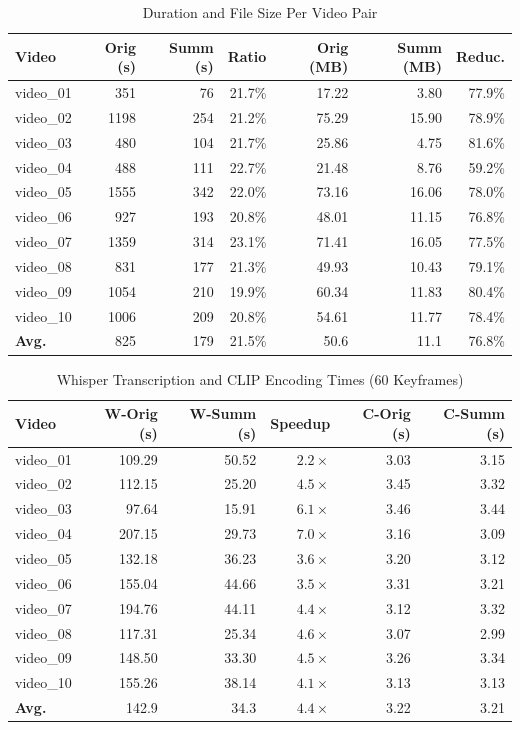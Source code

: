 \documentclass[10pt,conference]{IEEEtran}
\begin{document}
\begin{table}[H]
\centering
\caption{Duration and File Size Per Video Pair}
\label{tab:vi_size}
\begin{tabular}{lrrrrrr}
\toprule
\textbf{Video} & \textbf{Orig (s)} & \textbf{Summ (s)} & \textbf{Ratio} &
\textbf{Orig (MB)} & \textbf{Summ (MB)} & \textbf{Reduc.} \\
\midrule
video\_01 & 351  & 76  & 21.7\% & 17.22 & 3.80  & 77.9\% \\
video\_02 & 1198 & 254 & 21.2\% & 75.29 & 15.90 & 78.9\% \\
video\_03 & 480  & 104 & 21.7\% & 25.86 & 4.75  & 81.6\% \\
video\_04 & 488  & 111 & 22.7\% & 21.48 & 8.76  & 59.2\% \\
video\_05 & 1555 & 342 & 22.0\% & 73.16 & 16.06 & 78.0\% \\
video\_06 & 927  & 193 & 20.8\% & 48.01 & 11.15 & 76.8\% \\
video\_07 & 1359 & 314 & 23.1\% & 71.41 & 16.05 & 77.5\% \\
video\_08 & 831  & 177 & 21.3\% & 49.93 & 10.43 & 79.1\% \\
video\_09 & 1054 & 210 & 19.9\% & 60.34 & 11.83 & 80.4\% \\
video\_10 & 1006 & 209 & 20.8\% & 54.61 & 11.77 & 78.4\% \\
\midrule
\textbf{Avg.} & 825 & 179 & 21.5\% & 50.6 & 11.1 & 76.8\% \\
\bottomrule
\end{tabular}
\end{table}

\begin{table}[H]
\centering
\caption{Whisper Transcription and CLIP Encoding Times (60 Keyframes)}
\label{tab:vi_time}
\begin{tabular}{lrrrrr}
\toprule
\textbf{Video} & \textbf{W-Orig (s)} & \textbf{W-Summ (s)} &
\textbf{Speedup} & \textbf{C-Orig (s)} & \textbf{C-Summ (s)} \\
\midrule
video\_01 & 109.29 & 50.52 & $2.2\times$ & 3.03 & 3.15 \\
video\_02 & 112.15 & 25.20 & $4.5\times$ & 3.45 & 3.32 \\
video\_03 &  97.64 & 15.91 & $6.1\times$ & 3.46 & 3.44 \\
video\_04 & 207.15 & 29.73 & $7.0\times$ & 3.16 & 3.09 \\
video\_05 & 132.18 & 36.23 & $3.6\times$ & 3.20 & 3.12 \\
video\_06 & 155.04 & 44.66 & $3.5\times$ & 3.31 & 3.21 \\
video\_07 & 194.76 & 44.11 & $4.4\times$ & 3.12 & 3.32 \\
video\_08 & 117.31 & 25.34 & $4.6\times$ & 3.07 & 2.99 \\
video\_09 & 148.50 & 33.30 & $4.5\times$ & 3.26 & 3.34 \\
video\_10 & 155.26 & 38.14 & $4.1\times$ & 3.13 & 3.13 \\
\midrule
\textbf{Avg.} & 142.9 & 34.3 & $4.4\times$ & 3.22 & 3.21 \\
\bottomrule
\end{tabular}
\end{table}
\end{document}
